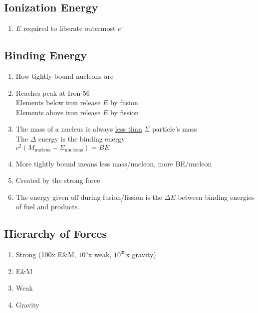 \documentclass[10pt,letter]{article}
\begin{document}
\subsection{Ionization Energy}
\begin{enumerate}
    \item $E$ required to liberate outermost $e^-$
\end{enumerate}

\subsection{Binding Energy}
\begin{enumerate}
    \item How tightly bound nucleons are
    \item Reaches peak at Iron-56\\
        Elements below iron release $E$ by fusion\\
        Elements above iron release $E$ by fission\\
    \item The mass of a nucleus is always \underline{less than} $\Sigma$ particle's mass\\
        The $\Delta$ energy is the binding energy\\
        $c^2(M_{\textrm{nucleus}}-\Sigma_{\textrm{nucleons}}) = BE$
    \item More tightly bound means less mass/nucleon, more BE/nucleon
    \item Created by the strong force
    \item The energy given off during fusion/fission is the $\Delta E$ between binding energies of fuel and products.
\end{enumerate}

\subsection{Hierarchy of Forces}
\begin{enumerate}
    \item Strong (100x E\&M, $10^5$x weak, $10^{39}$x gravity)
    \item E\&M
    \item Weak
    \item Gravity
\end{enumerate}
\end{document}
